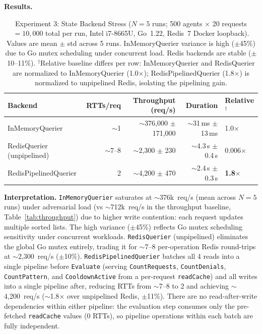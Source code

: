 \documentclass[11pt]{article}
\theoremstyle{definition}
\begin{document}
\textbf{Results.}
\begin{table}[h!]
\centering\small
\begin{tabular}{lrrrl}
\toprule
Backend                    & RTTs/req & Throughput (req/s) & Duration       & Relative$^\dagger$ \\
\midrule
InMemoryQuerier            & $\sim$1  & $\sim$376{,}000 $\pm$ 171{,}000 & $\sim$31\,ms $\pm$ 13\,ms & 1.0$\times$ \\
RedisQuerier (unpipelined) & $\sim$7--8 & $\sim$2{,}300 $\pm$ 230      & $\sim$4.3\,s $\pm$ 0.4\,s  & 0.006$\times$ \\
RedisPipelinedQuerier      & 2        & $\sim$4{,}200 $\pm$ 470        & $\sim$2.4\,s $\pm$ 0.3\,s  & \textbf{1.8$\times$} \\
\bottomrule
\end{tabular}
\caption{Experiment 3: State Backend Stress ($N=5$ runs; 500 agents $\times$ 20 requests
$= 10{,}000$ total per run, Intel i7-8665U, Go~1.22, Redis~7 Docker loopback).
Values are mean $\pm$ std across 5 runs.
InMemoryQuerier variance is high ($\pm$45\%) due to Go mutex scheduling under concurrent load.
Redis backends are stable ($\pm$10--11\%).
$^\dagger$Relative baseline differs per row: InMemoryQuerier and RedisQuerier
are normalized to InMemoryQuerier (1.0$\times$); RedisPipelinedQuerier (1.8$\times$)
is normalized to unpipelined Redis, isolating the pipelining gain.}
\label{tab:adv-exp3}
\end{table}

\textbf{Interpretation.}
\texttt{InMemoryQuerier} saturates at $\sim$376k~req/s (mean across $N=5$ runs) under adversarial load
(vs $\sim$712k~req/s in the throughput baseline, Table~\ref{tab:throughput})
due to higher write contention: each request updates multiple sorted lists.
The high variance ($\pm$45\%) reflects Go mutex scheduling sensitivity under concurrent workloads.
\texttt{RedisQuerier} (unpipelined) eliminates the global Go mutex entirely,
trading it for $\sim$7--8 per-operation Redis round-trips at $\sim$2{,}300~req/s ($\pm$10\%).
\texttt{RedisPipelinedQuerier} batches all 4 reads into a single pipeline
before \texttt{Evaluate} (serving \texttt{CountRequests}, \texttt{CountDenials},
\texttt{CountPattern}, and \texttt{CooldownActive} from a per-request
\texttt{readCache}) and all writes into a single pipeline after,
reducing RTTs from $\sim$7--8 to 2 and achieving $\sim$4{,}200~req/s
($\sim$1.8$\times$ over unpipelined Redis, $\pm$11\%).
There are no read-after-write dependencies within either pipeline:
the evaluation step consumes only the pre-fetched \texttt{readCache} values
(0 RTTs), so pipeline operations within each batch are fully independent.
\end{document}
